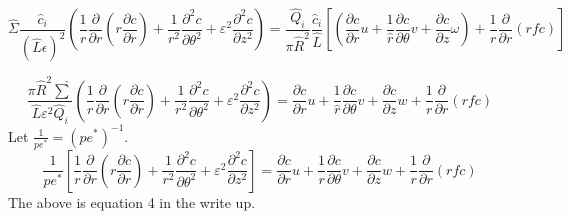 \documentclass[12pt]{article}
\renewcommand{\(}{\left (}
\renewcommand{\)}{\right )}
\begin{document}
\begin{equation}
\hat{\Sigma}\frac{\hat{c}_i}{(\hat{L}\epsilon)^2}\left(\frac{1}{r} \frac{\partial}{\partial r}\left(r \frac{\partial c}{\partial r}\right)+\frac{1}{r^{2}} \frac{\partial^{2} c}{\partial \theta^{2}}+\varepsilon^{2} \frac{\partial^{2} c}{\partial z^{2}}\right)
=\frac{\hat{Q}_i}{\pi \hat{R}^2}\frac{\hat{c}_i}{\hat{L}}
\left[\left(\frac{\partial c}{\partial r} u+\frac{1}{\hat{r}}\frac{\partial c}{\partial \theta} v+\frac{\partial c}{\partial z} \omega\right)+\frac{1}{r} \frac{\partial}{\partial r}(r f c)\right]
\end{equation}

\begin{equation}
\frac{\pi \hat{R}^{2} \hat{\sum}}{\hat{L} \varepsilon^{2} \hat{Q}_{i}}\left(\frac{1}{r} \frac{\partial}{\partial r}\left(r \frac{\partial c}{\partial r}\right)+\frac{1}{r^{2}} \frac{\partial^{2} c}{\partial \theta^{2}}+\varepsilon^{2} \frac{\partial^{2} c}{\partial z^{2}}\right)= \frac{\partial c}{\partial r} u+\frac{1}{\hat{r}}\frac{\partial c}{\partial \theta} v+\frac{\partial c}{\partial z} w+\frac{1}{r} \frac{\partial}{\partial r}(r f c)
\end{equation}
Let $\frac{1}{pe^{*}} = (pe^*)^{-1}.$
\begin{equation}
	\frac{1}{pe^{*}}\left[\frac{1}{r} \frac{\partial}{\partial r}\left(r \frac{\partial c}{\partial r}\right)+\frac{1}{r^{2}} \frac{\partial^{2} c}{\partial \theta^{2}}+\varepsilon^{2} \frac{\partial^{2} c}{\partial z^{2}}\right]= \frac{\partial c}{\partial r} u+\frac{1}{{r}}\frac{\partial c}{\partial \theta} v+\frac{\partial c}{\partial z} w+\frac{1}{r} \frac{\partial}{\partial r}(r f c)
\end{equation}
The above is equation 4 in the write up.
\end{document}
